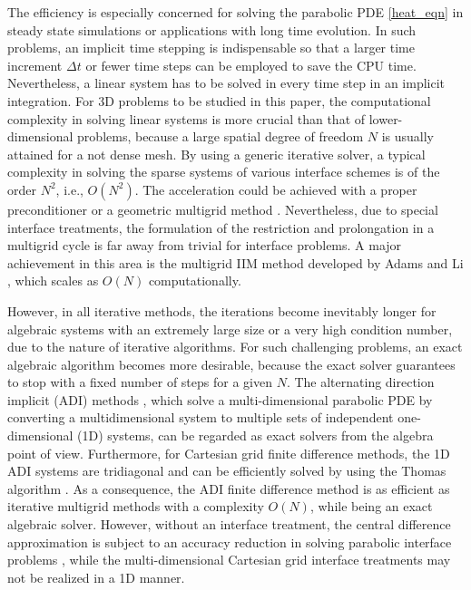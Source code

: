 \documentclass[dissertation]{uathesis}
\begin{document}
\begin{body}
\begin{flushleft}
\hspace{1cm} The efficiency is especially concerned for solving the parabolic PDE \eqref{heat_eqn} 
in  steady state simulations or applications with long time evolution. 
In such problems, an implicit time stepping is indispensable so that a larger time increment $\Delta t$ or fewer time steps can be employed to save the CPU time. Nevertheless, a linear system has to be solved in every time step in an implicit integration. For 3D problems to be studied in this paper, the computational complexity in solving linear systems is more crucial than that of lower-dimensional problems, because a large  spatial degree of freedom $N$ is usually attained for a not dense mesh. By using a generic iterative solver, a typical complexity in solving the sparse systems of various interface schemes is of the order $N^2$, i.e., $O(N^2)$. The acceleration could be achieved with a proper preconditioner or a geometric multigrid method \cite{horton1995space}. Nevertheless, due to special interface treatments, the formulation of the restriction and prolongation in a multigrid cycle is far away from trivial for interface problems. A major achievement in this area is the multigrid IIM method developed by Adams and Li \cite{adams2002immersed}, which scales as $O(N)$ computationally. 


\hspace{1cm} However, in all iterative methods, the iterations become inevitably longer for algebraic systems with an extremely large size or a very high condition number, due to the nature of iterative algorithms. For such challenging problems, an exact algebraic algorithm becomes more desirable, because the exact solver guarantees to stop with a fixed number of steps for a given $N$. 
The alternating direction implicit (ADI) methods \cite{douglas1955numerical2, paeceman1955numerical}, which solve a multi-dimensional parabolic PDE by  converting a multidimensional system to multiple sets of independent one-dimensional (1D) systems, can be regarded as exact solvers from the algebra point of view. Furthermore, for Cartesian grid finite difference methods, the 1D ADI systems are tridiagonal and can be efficiently solved by using the Thomas algorithm \cite{strikwerda2004}. As a consequence, the ADI finite difference method is as efficient as iterative multigrid methods with a complexity $O(N)$, while being an exact algebraic solver. However, without an interface treatment, the central difference approximation is subject to an accuracy reduction in solving parabolic interface problems \cite{geng2013,zhao2014operator}, while the multi-dimensional Cartesian grid interface treatments \cite{adams2002immersed, bouchon2010immersed, bouchon2010immersed2, kandilarov2004immersed, kandilarov2007immersed} may not be realized in a 1D manner. 


\end{flushleft}
\end{body}
\end{document}
